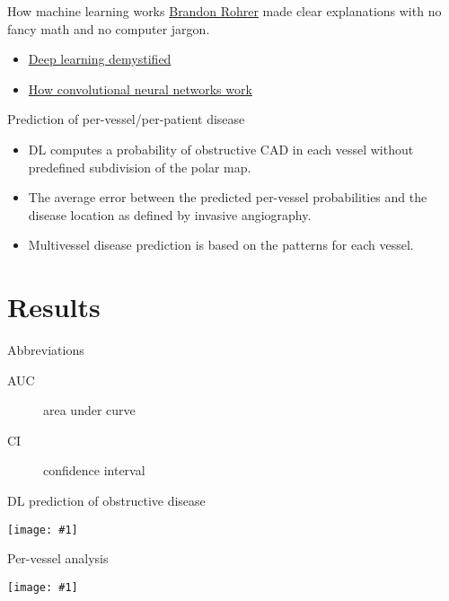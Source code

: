 \documentclass{beamer}
\newcommand*{\solo}[1]{\texttt{[image: \#1]}}
\begin{document}
\begin{frame}{How machine learning works}
    \href{https://brohrer.github.io/}{Brandon Rohrer} made clear explanations
    with no fancy math and no computer jargon.
    \begin{itemize}
        \item \href{https://brohrer.github.io/deep_learning_demystified.html}{Deep learning demystified}
        \item \href{https://brohrer.github.io/how_convolutional_neural_networks_work.html}{How convolutional neural networks work}
    \end{itemize}
\end{frame}

\begin{frame}{Prediction of per-vessel/per-patient disease}
    \begin{itemize}
        \item
            DL computes a probability of obstructive CAD in each vessel without
            predefined subdivision of the polar map.
        \item
            The average error between the predicted per-vessel probabilities
            and the disease location as defined by invasive angiography.
        \item
            Multivessel disease prediction is based on the patterns for each
            vessel.
    \end{itemize}
\end{frame}

\section{Results}
\begin{frame}{Abbreviations}
    \begin{description}
        \item[AUC] area under curve
        \item[CI] confidence interval
    \end{description}
\end{frame}

\begin{frame}{DL prediction of obstructive disease}
    \begin{center}
        \solo{2.eps}
    \end{center}
\end{frame}

\begin{frame}{Per-vessel analysis}
    \begin{center}
        \solo{3.eps}
    \end{center}
\end{frame}
\end{document}

